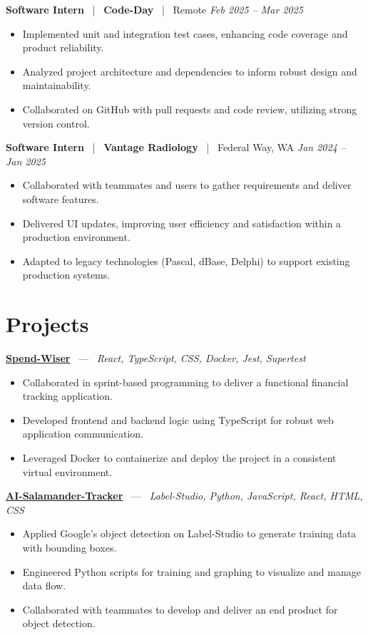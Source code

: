 \documentclass[10pt, letterpaper]{article}
\newcommand{\jobhead}[4]{%
  \vspace{5pt}%
  {\bfseries\color{dark}#1}%
  ~{\color{light}|}~%
  {\bfseries\color{navy}#2}%
  ~{\color{light}|}~%
  {\color{light}#3}%
  \hfill{\color{light}\small\textit{#4}}\\[-2pt]%
}
\newcommand{\projhead}[3]{%
  \vspace{5pt}%
  {\bfseries\color{dark}\href{#2}{#1}}%
  ~{\color{light}---}~%
  {\color{light}\small\textit{#3}}\\[-2pt]%
}
\begin{document}
\jobhead{Software Intern}{Code-Day}{Remote}{Feb 2025 – Mar 2025}
\begin{itemize}
  \item Implemented unit and integration test cases, enhancing code coverage and product reliability.
  \item Analyzed project architecture and dependencies to inform robust design and maintainability.
  \item Collaborated on GitHub with pull requests and code review, utilizing strong version control.
\end{itemize}

\jobhead{Software Intern}{Vantage Radiology}{Federal Way, WA}{Jan 2024 – Jan 2025}
\begin{itemize}
  \item Collaborated with teammates and users to gather requirements and deliver software features.
  \item Delivered UI updates, improving user efficiency and satisfaction within a production environment.
  \item Adapted to legacy technologies (Pascal, dBase, Delphi) to support existing production systems.
\end{itemize}

\section{Projects}

\projhead{Spend-Wiser}{https://github.com/JesseChum/w26-sdev372-spendwiser-finance-tracker}{React, TypeScript, CSS, Docker, Jest, Supertest}
\begin{itemize}
  \item Collaborated in sprint-based programming to deliver a functional financial tracking application.
  \item Developed frontend and backend logic using TypeScript for robust web application communication.
  \item Leveraged Docker to containerize and deploy the project in a consistent virtual environment.
\end{itemize}

\projhead{AI-Salamander-Tracker}{https://github.com/xavierb117/Salamander-Tracker-YOLO}{Label-Studio, Python, JavaScript, React, HTML, CSS}
\begin{itemize}
  \item Applied Google's object detection on Label-Studio to generate training data with bounding boxes.
  \item Engineered Python scripts for training and graphing to visualize and manage data flow.
  \item Collaborated with teammates to develop and deliver an end product for object detection.
\end{itemize}
\end{document}
